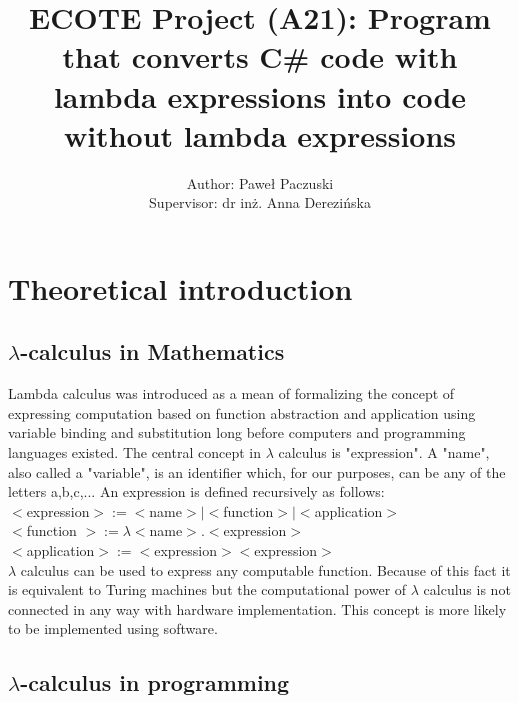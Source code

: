 \documentclass[]{report}
\title{ECOTE Project (A21):  Program that converts C\# code with lambda expressions into code without lambda expressions}
\author{Author: Paweł Paczuski \\ Supervisor: dr inż. Anna Derezińska}
\begin{document}
    \maketitle
    
    \tableofcontents
    \pagebreak
    
    \chapter{Theoretical introduction}
    \section{$\lambda$-calculus in Mathematics}
    Lambda calculus was introduced as a mean of formalizing the concept of expressing computation based on function abstraction and application using variable binding and substitution long before computers and programming languages existed. \cite{lambddef}
    The central concept in $\lambda$ calculus is "expression". A  "name",  also  called a "variable", is an identifier which, for our purposes, can be any of the letters
    a,b,c,...
    An expression is defined recursively as follows\cite{lambdintro}:\\
    $<$expression$>:=< $name$ >|< $function$ >|< $application$ > $ \\
    $<$function $>:= \lambda < $name$ >.< $expression$ > $\\
    $<$application$>:=<$expression$ >< $expression$ > $\\
    
    $\lambda$  calculus can be used to express any computable function. Because of this fact it is equivalent to Turing machines but the computational power of $\lambda$ calculus is not connected in any way with hardware implementation. This concept is more likely to be implemented using software.
    
    \section{$\lambda$-calculus in programming}
    
\end{document}
